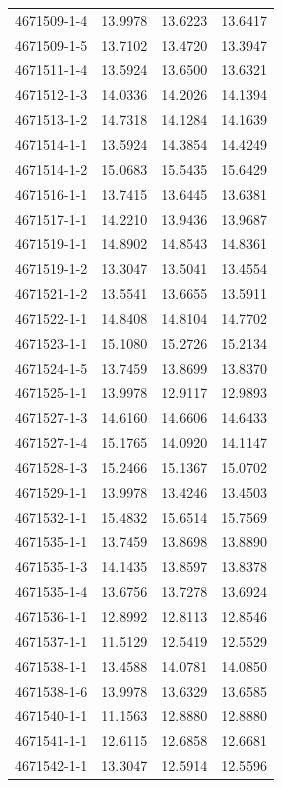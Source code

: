 \begin{longtable}{lrrr}
4671509-1-4 & 13.9978 & 13.6223 & 13.6417 \\
4671509-1-5 & 13.7102 & 13.4720 & 13.3947 \\
4671511-1-4 & 13.5924 & 13.6500 & 13.6321 \\
4671512-1-3 & 14.0336 & 14.2026 & 14.1394 \\
4671513-1-2 & 14.7318 & 14.1284 & 14.1639 \\
4671514-1-1 & 13.5924 & 14.3854 & 14.4249 \\
4671514-1-2 & 15.0683 & 15.5435 & 15.6429 \\
4671516-1-1 & 13.7415 & 13.6445 & 13.6381 \\
4671517-1-1 & 14.2210 & 13.9436 & 13.9687 \\
4671519-1-1 & 14.8902 & 14.8543 & 14.8361 \\
4671519-1-2 & 13.3047 & 13.5041 & 13.4554 \\
4671521-1-2 & 13.5541 & 13.6655 & 13.5911 \\
4671522-1-1 & 14.8408 & 14.8104 & 14.7702 \\
4671523-1-1 & 15.1080 & 15.2726 & 15.2134 \\
4671524-1-5 & 13.7459 & 13.8699 & 13.8370 \\
4671525-1-1 & 13.9978 & 12.9117 & 12.9893 \\
4671527-1-3 & 14.6160 & 14.6606 & 14.6433 \\
4671527-1-4 & 15.1765 & 14.0920 & 14.1147 \\
4671528-1-3 & 15.2466 & 15.1367 & 15.0702 \\
4671529-1-1 & 13.9978 & 13.4246 & 13.4503 \\
4671532-1-1 & 15.4832 & 15.6514 & 15.7569 \\
4671535-1-1 & 13.7459 & 13.8698 & 13.8890 \\
4671535-1-3 & 14.1435 & 13.8597 & 13.8378 \\
4671535-1-4 & 13.6756 & 13.7278 & 13.6924 \\
4671536-1-1 & 12.8992 & 12.8113 & 12.8546 \\
4671537-1-1 & 11.5129 & 12.5419 & 12.5529 \\
4671538-1-1 & 13.4588 & 14.0781 & 14.0850 \\
4671538-1-6 & 13.9978 & 13.6329 & 13.6585 \\
4671540-1-1 & 11.1563 & 12.8880 & 12.8880 \\
4671541-1-1 & 12.6115 & 12.6858 & 12.6681 \\
4671542-1-1 & 13.3047 & 12.5914 & 12.5596 \\

\end{longtable}
